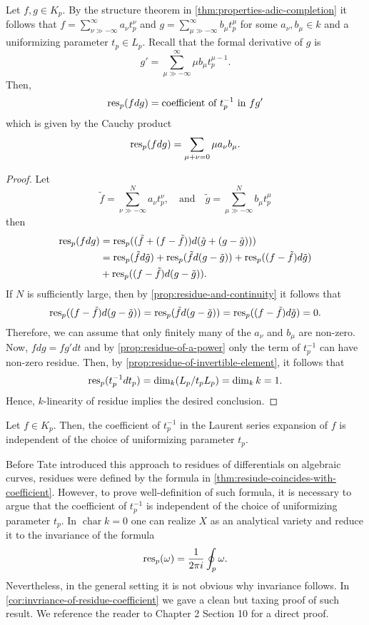 \begin{theorem}\label{thm:resiude-coincides-with-coefficient}
	Let $f,g \in K_{p}$. By the structure theorem in \cref{thm:properties-adic-completion} it follows that $f = \sum_{\nu \gg -\infty}^{\infty} a_{\nu}t_{p}^{\nu}$ and $g = \sum_{\mu \gg -\infty}^{\infty} b_{\mu}t_{p}^{\mu}$ for some $a_{\nu},b_{\mu} \in k$ and a uniformizing parameter $t_{p}\in L_{p} $. Recall that the formal derivative of $g$ is
	\[
		g' = \sum_{\mu \gg -\infty}^{\infty} \mu b_{\mu}t_{p}^{\mu -1}.
	\]
	Then,
	\[
		\operatorname{res}_{p}(fdg) = \text{coefficient of }t_{p}^{-1}\text{ in } fg'
	\]
	which is given by the Cauchy product
	\[
		\operatorname{res}_{p}(fdg) = \sum_{\mu + \nu = 0}\mu a_\nu{}b_{\mu}.
	\]
\end{theorem}
\begin{proof}
	Let
	\[
		\tilde{f} = \sum_{\nu\gg-\infty}^{N} a_{\nu}t_{p}^{\nu},\quad\text{and}\quad\tilde{g} = \sum_{\mu\gg-\infty}^{N} b_{\mu}t_{p}^{\mu}
	\]
	then 
	\begin{align*}
		\operatorname{res}_{p}(fdg) &= \operatorname{res}_{p}( (\tilde{f} + (f - \tilde{f}))d(\tilde{g} + (g - \tilde{g}))) \\
		&= \operatorname{res}_{p}(\tilde{f}d\tilde{g}) + \operatorname{res}_{p}(\tilde{f}d(g - \tilde{g})) + \operatorname{res}_{p}((f-\tilde{f}) d\tilde{g}) \\ &+ \operatorname{res}_{p}( (f - \tilde{f})d(g-\tilde{g})).
	\end{align*}
	If $N$ is sufficiently large, then by \cref{prop:residue-and-continuity} it follows that 
	\[
		\operatorname{res}_{p}( (f - \tilde{f})d(g-\tilde{g})) = \operatorname{res}_{p}(\tilde{f}d(g - \tilde{g})) = \operatorname{res}_{p}((f-\tilde{f}) d\tilde{g}) = 0.
	\]
	Therefore, we can assume that only finitely many of the $a_{\nu}$ and $b_{\mu}$ are non-zero. Now, $fdg = f g' dt$ and by \cref{prop:residue-of-a-power} only the term of $t_{p}^{-1}$ can have non-zero residue. Then, by \cref{prop:residue-of-invertible-element}, it follows that
	\[
		\operatorname{res}_{p}(t_{p}^{-1}dt_{p}) = \dim_{k}(L_{p}/t_{p}L_{p}) = \dim_{k}k = 1. 	
	\]
	Hence, $k$-linearity of residue implies the desired conclusion.
\end{proof}
\begin{corollary}\label{cor:invriance-of-residue-coefficient}
	Let $f\in K_{p}$. Then, the coefficient of $t_{p}^{-1}$ in the Laurent series expansion of $f$ is independent of the choice of uniformizing parameter $t_{p}$.	
\end{corollary}
\begin{remark}\label{rem:previouses-approaches-residues}
	Before Tate introduced this approach to residues of differentials on algebraic curves, residues were defined by the formula in \cref{thm:resiude-coincides-with-coefficient}. However, to prove well-definition of such formula, it is necessary to argue that the coefficient of $t_{p}^{-1}$ is independent of the choice of uniformizing parameter $t_{p}$. In $\operatorname{char}k = 0$ one can realize $X$ as an analytical variety and reduce it to the invariance of the formula
	\[
		\operatorname{res}_{p}(\omega) = \frac{1}{2\pi i}\oint_{p} \omega.
	\]
	Nevertheless, in the general setting it is not obvious why invariance follows. In \cref{cor:invriance-of-residue-coefficient} we gave a clean but taxing proof of such result. We reference the reader to \cite{serre} Chapter 2 Section 10 for a direct proof.
\end{remark}
